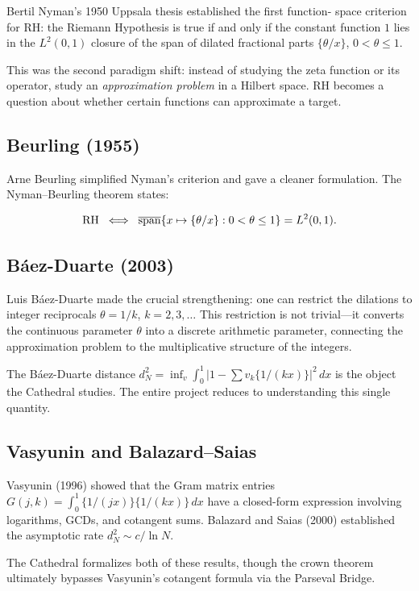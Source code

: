 \documentclass[11pt,a4paper]{article}
\begin{document}
Bertil Nyman's 1950 Uppsala thesis established the first function-
space criterion for RH: the Riemann Hypothesis is true if and only
if the constant function $1$ lies in the $L^2(0,1)$ closure of the
span of dilated fractional parts $\{\theta/x\}$, $0 < \theta \leq 1$.

This was the second paradigm shift: instead of studying the zeta
function or its operator, study an \emph{approximation problem}
in a Hilbert space. RH becomes a question about whether certain
functions can approximate a target.

\subsection{Beurling (1955)}

Arne Beurling simplified Nyman's criterion and gave a cleaner
formulation. The Nyman--Beurling theorem states:

\[
  \mathrm{RH} \;\iff\;
  \overline{\operatorname{span}}\{x \mapsto \{\theta/x\} :
  0 < \theta \leq 1\} = L^2(0,1).
\]

\subsection{B\'aez-Duarte (2003)}

Luis B\'aez-Duarte made the crucial strengthening: one can restrict
the dilations to integer reciprocals $\theta = 1/k$, $k = 2, 3,
\ldots$ This restriction is not trivial---it converts the
continuous parameter $\theta$ into a discrete arithmetic parameter,
connecting the approximation problem to the multiplicative structure
of the integers.

The B\'aez-Duarte distance $d_N^2 = \inf_v \int_0^1 |1 - \sum v_k
\{1/(kx)\}|^2\,dx$ is the object the Cathedral studies. The entire
project reduces to understanding this single quantity.

\subsection{Vasyunin and Balazard--Saias}

Vasyunin (1996) showed that the Gram matrix entries $G(j,k) =
\int_0^1 \{1/(jx)\}\{1/(kx)\}\,dx$ have a closed-form expression
involving logarithms, GCDs, and cotangent sums. Balazard and Saias
(2000) established the asymptotic rate $d_N^2 \sim c/\ln N$.

The Cathedral formalizes both of these results, though the crown
theorem ultimately bypasses Vasyunin's cotangent formula via the
Parseval Bridge.
\end{document}
